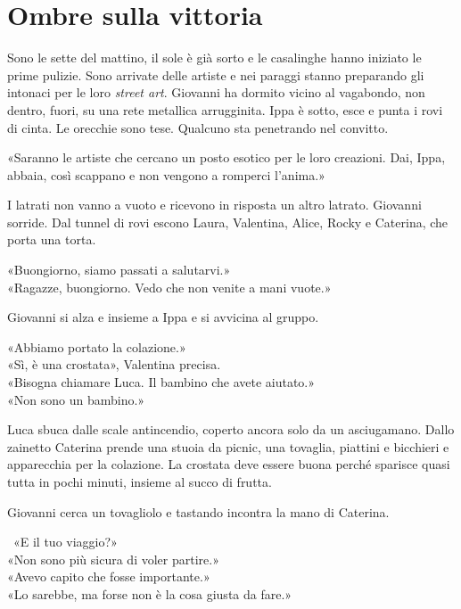 \chapter{Ombre sulla vittoria}

Sono le sette del mattino, il sole \`e gi\`a sorto e le casalinghe hanno iniziato le prime pulizie.
Sono arrivate delle artiste e nei paraggi stanno preparando gli intonaci per le loro \emph{street art}.
Giovanni ha dormito vicino al vagabondo, non dentro, fuori, su una rete metallica arrugginita.
Ippa \`e sotto, esce e punta i rovi di cinta.
Le orecchie sono tese.
Qualcuno sta penetrando nel convitto.

\par\medskip
«Saranno le artiste che cercano un posto esotico per le loro creazioni.
Dai, Ippa, abbaia, cos\`i scappano e non vengono a romperci l’anima.»

\par\medskip
I latrati non vanno a vuoto e ricevono in risposta un altro latrato.
Giovanni sorride.
Dal tunnel di rovi escono Laura, Valentina, Alice, Rocky e Caterina, che porta una torta.

\par\medskip
«Buongiorno, siamo passati a salutarvi.»\\
«Ragazze, buongiorno. Vedo che non venite a mani vuote.»

\par\medskip
Giovanni si alza e insieme a Ippa e si avvicina al gruppo.

\par\medskip
«Abbiamo portato la colazione.»\\
«Sì, \`e una crostata», Valentina precisa.\\
«Bisogna chiamare Luca. Il bambino che avete aiutato.»\\
«Non sono un bambino.»

\par\medskip
Luca sbuca dalle scale antincendio, coperto ancora solo da un asciugamano.
Dallo zainetto Caterina prende una stuoia da picnic, una tovaglia, piattini e bicchieri e apparecchia per la colazione.
La crostata deve essere buona perch\'e sparisce quasi tutta in pochi minuti, insieme al succo di frutta.

\par\medskip
Giovanni cerca un tovagliolo e tastando incontra la mano di Caterina.

\par\medskip\
«E il tuo viaggio?»\\
«Non sono pi\`u sicura di voler partire.»\\
«Avevo capito che fosse importante.»\\
«Lo sarebbe, ma forse non \`e la cosa giusta da fare.»

